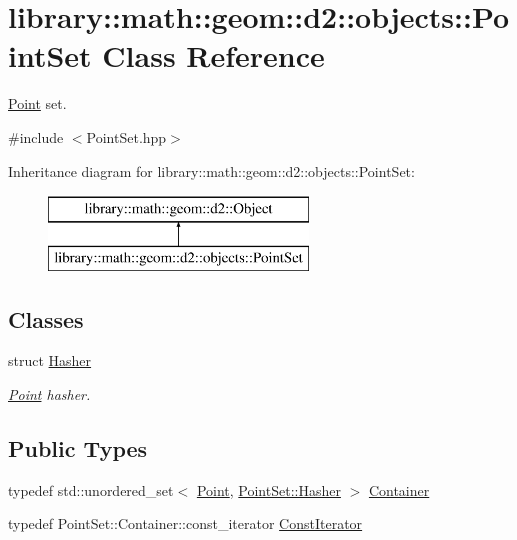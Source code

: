 \hypertarget{classlibrary_1_1math_1_1geom_1_1d2_1_1objects_1_1_point_set}{}\section{library\+:\+:math\+:\+:geom\+:\+:d2\+:\+:objects\+:\+:Point\+Set Class Reference}
\label{classlibrary_1_1math_1_1geom_1_1d2_1_1objects_1_1_point_set}


\hyperlink{classlibrary_1_1math_1_1geom_1_1d2_1_1objects_1_1_point}{Point} set.  




{\ttfamily \#include $<$Point\+Set.\+hpp$>$}

Inheritance diagram for library\+:\+:math\+:\+:geom\+:\+:d2\+:\+:objects\+:\+:Point\+Set\+:\begin{figure}[H]
\begin{center}
\leavevmode
\includegraphics[height=2.000000cm]{classlibrary_1_1math_1_1geom_1_1d2_1_1objects_1_1_point_set}
\end{center}
\end{figure}
\subsection*{Classes}
\begin{DoxyCompactItemize}
\item 
struct \hyperlink{structlibrary_1_1math_1_1geom_1_1d2_1_1objects_1_1_point_set_1_1_hasher}{Hasher}
\begin{DoxyCompactList}\small\item\em \hyperlink{classlibrary_1_1math_1_1geom_1_1d2_1_1objects_1_1_point}{Point} hasher. \end{DoxyCompactList}\end{DoxyCompactItemize}
\subsection*{Public Types}
\begin{DoxyCompactItemize}
\item 
typedef std\+::unordered\+\_\+set$<$ \hyperlink{classlibrary_1_1math_1_1geom_1_1d2_1_1objects_1_1_point}{Point}, \hyperlink{structlibrary_1_1math_1_1geom_1_1d2_1_1objects_1_1_point_set_1_1_hasher}{Point\+Set\+::\+Hasher} $>$ \hyperlink{classlibrary_1_1math_1_1geom_1_1d2_1_1objects_1_1_point_set_a4ad340e72ff6c1a80199804754cd1af9}{Container}
\item 
typedef Point\+Set\+::\+Container\+::const\+\_\+iterator \hyperlink{classlibrary_1_1math_1_1geom_1_1d2_1_1objects_1_1_point_set_ad4c4f52fdc966f0d2031402edefc9e98}{Const\+Iterator}
\end{DoxyCompactItemize}
